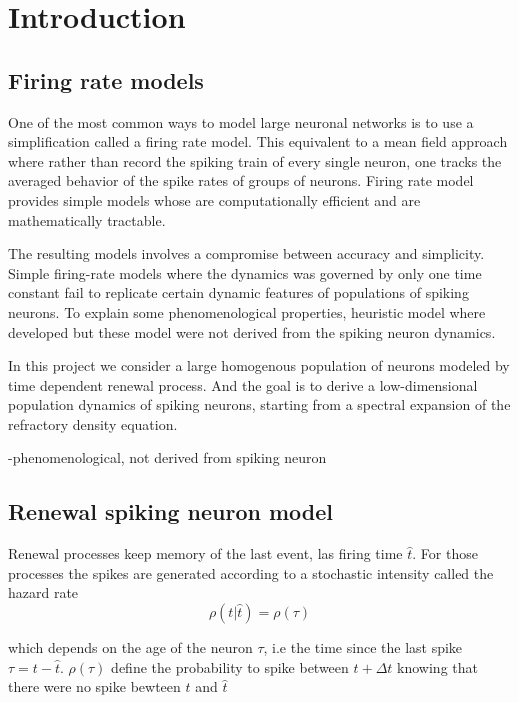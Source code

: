 \documentclass[a4paper,11pt,twoside]{article}
\numberwithin{equation}{section}
\begin{document}
\tableofcontents
\newpage

\chapter{Introduction}
\label{sec:intro}

\section{Firing rate models}
\label{subsec:riringrate}

One of the most common ways to model large neuronal networks is to use a simplification called a firing rate model.  This equivalent to a mean field approach where rather than record the spiking train of every single neuron, one tracks the averaged behavior of the spike rates of groups of neurons. Firing rate model provides simple models whose are computationally efficient and are mathematically tractable. 

The resulting models involves a compromise between accuracy and simplicity. Simple
firing-rate models where the dynamics was governed by only one time constant fail to replicate certain dynamic features of populations of spiking neurons. To explain some phenomenological properties, heuristic model where developed but these model were not derived from the spiking neuron dynamics. 

In this project we consider a large homogenous population of neurons modeled by time dependent renewal process. And the goal is to derive a low-dimensional population dynamics of spiking neurons, starting from a spectral expansion of the refractory density equation.

-phenomenological, not derived from spiking neuron %

\section{Renewal spiking neuron model}
\label{subsec:renew}

Renewal processes keep memory of the last event, las firing time $\hat{t}$. For those processes the spikes are generated according to a stochastic intensity called the hazard rate
\begin{equation}
\label{eq:rho1}
\rho(t|\hat{t})=\rho(\tau)
\end{equation}

which depends on the age of the neuron $\tau$, i.e the time since the last spike $\tau=t-\hat{t}$. $\rho(\tau)$ define the probability to spike between $t+\Delta t$ knowing that there were no spike bewteen $t$ and $\hat{t}$
\end{document}
